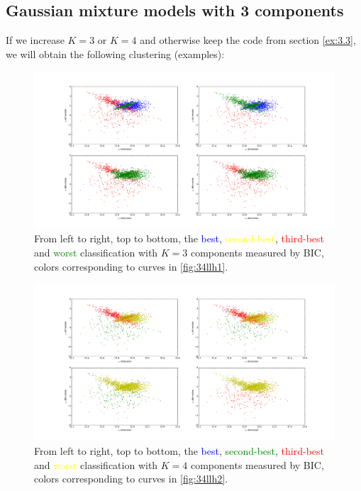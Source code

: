 \subsection{Gaussian mixture models with 3 components}\label{ex:3.4}
If we increase $K=3$ or $K=4$ and otherwise keep the code from section \ref{ex:3.3}, we will obtain the following clustering (examples):

\begin{figure}[H]
	\centering \includegraphics{../Figures/Ex3_4_scatters1.png}
	\caption{From left to right, top to bottom, the \textcolor{blue}{best}, \textcolor{yellow}{second-best}, \textcolor{red}{third-best} and \textcolor{green}{worst} classification with $K=3$ components measured by BIC, colors corresponding to curves in \ref{fig:34llh1}.}
	\label{fig:34scatter1}
\end{figure}

\begin{figure}[H]
	\centering \includegraphics{../Figures/Ex3_4_scatters2.png}
	\caption{From left to right, top to bottom, the \textcolor{blue}{best}, \textcolor{green}{second-best}, \textcolor{red}{third-best} and \textcolor{yellow}{worst} classification with $K=4$ components measured by BIC, colors corresponding to curves in \ref{fig:34llh2}.}
	\label{fig:34scatter2}
\end{figure}

